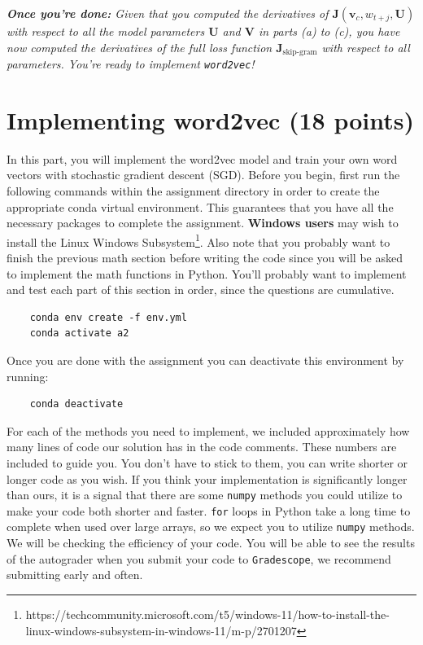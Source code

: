 \documentclass{article}
\begin{document}
\begin{enumerate}[label=(\alph*)]
\textit{\textbf{Once you're done:} Given that you computed the derivatives of $\bm J(\bm v_c, w_{t+j}, \bm U)$ with respect to all the model parameters $\bm U$ and $\bm V$ in parts (a) to (c), you have now computed the derivatives of the full loss function $\bm J_{\text{skip-gram}}$ with respect to all parameters. You're ready to implement \texttt{word2vec}!} %

\end{enumerate}

\section{Implementing word2vec (18 points)}
In this part, you will implement the word2vec model and train your own word vectors with stochastic gradient descent (SGD). Before you begin, first run the following commands within the assignment directory in order to create the appropriate conda virtual environment. This guarantees that you have all the necessary packages to complete the assignment. \textbf{Windows users} may wish to install the Linux Windows Subsystem\footnote{https://techcommunity.microsoft.com/t5/windows-11/how-to-install-the-linux-windows-subsystem-in-windows-11/m-p/2701207}. Also note that you probably want to finish the previous math section before writing the code since you will be asked to implement the math functions in Python. You’ll probably want to implement and test each part of this section in order, since the questions are cumulative.

\begin{verbatim}
    conda env create -f env.yml
    conda activate a2
\end{verbatim}

Once you are done with the assignment you can deactivate this environment by running:
\begin{verbatim}
    conda deactivate
\end{verbatim}

For each of the methods you need to implement, we included approximately how many lines of code our solution has in the code comments. These numbers are included to guide you. You don't have to stick to them, you can write shorter or longer code as you wish. If you think your implementation is significantly longer than ours, it is a signal that there are some \texttt{numpy} methods you could utilize to make your code both shorter and faster. \texttt{for} loops in Python take a long time to complete when used over large arrays, so we expect you to utilize \texttt{numpy} methods. We will be checking the efficiency of your code. You will be able to see the results of the autograder when you submit your code to \texttt{Gradescope}, we recommend submitting early and often.
\end{document}

